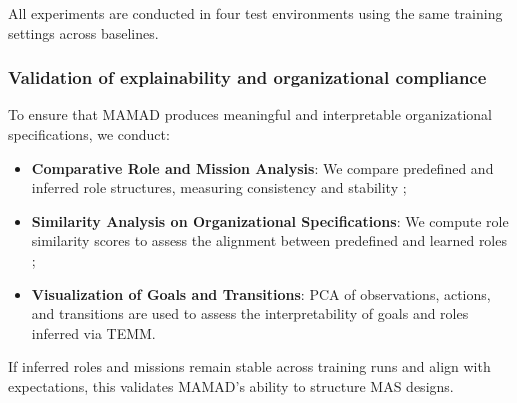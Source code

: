 \documentclass[pdflatex,sn-mathphys-num]{sn-jnl}%
\theoremstyle{thmstyleone}%
\theoremstyle{thmstyletwo}%
\theoremstyle{thmstylethree}%
\begin{document}
All experiments are conducted in four test environments using the same training settings across baselines.

\subsubsection{Validation of explainability and organizational compliance}
To ensure that MAMAD produces meaningful and interpretable organizational specifications, we conduct:
\begin{itemize}
    \item \textbf{Comparative Role and Mission Analysis}: We compare predefined and inferred role structures, measuring consistency and stability ;
    \item \textbf{Similarity Analysis on Organizational Specifications}: We compute role similarity scores to assess the alignment between predefined and learned roles ;
    \item \textbf{Visualization of Goals and Transitions}: PCA of observations, actions, and transitions are used to assess the interpretability of goals and roles inferred via TEMM.
\end{itemize}

If inferred roles and missions remain stable across training runs and align with expectations, this validates MAMAD's ability to structure MAS designs.


\end{document}

